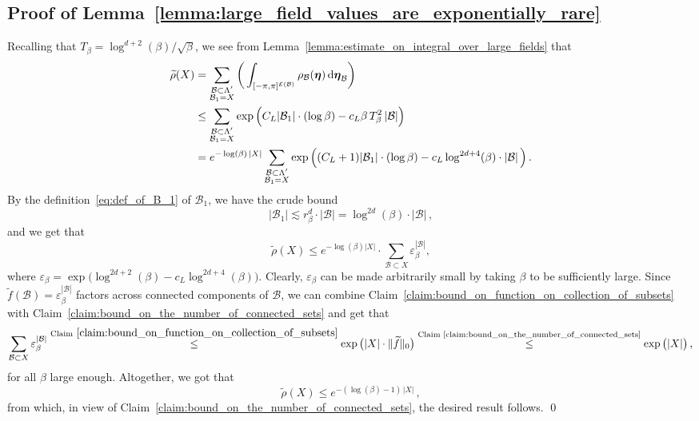 \documentclass[11pt]{article}
\theoremstyle{definition}
\theoremstyle{remark}
\numberwithin{theorem}{section}
\def\eps{{\varepsilon}}
\def\La{{\Lambda}}
\newcommand{\cE}{\mathcal{E}}
\begin{document}
    \subsection{Proof of Lemma~\ref{lemma:large_field_values_are_exponentially_rare}}
    Recalling that $T_\beta = \log^{d+2}(\beta)/\sqrt{\beta}$, we see from Lemma~\ref{lemma:estimate_on_integral_over_large_fields} that 
    \begin{align*}
        \widetilde{\rho}(X) &= \sum_{\substack{\mathcal{B} \subset \La^\prime \\ \mathcal{B}_1 = X}} \bigg(\int_{[-\pi,\pi]^{\cE(\mathcal{B})}} \rho_{\mathcal{B}}(\boldsymbol{\eta}) \, {\rm d} \boldsymbol{\eta}_{\mathcal{B}}\bigg) \\ &\le \sum_{\substack{\mathcal{B} \subset \La^\prime \\ \mathcal{B}_1 = X}} \exp\Big( C_L |\mathcal{B}_1| \cdot (\log \beta) - c_L \beta \, T_\beta^2  \, |\mathcal{B}| \Big) \\ &= e^{-\log(\beta)\, |X|} \sum_{\substack{\mathcal{B} \subset \La^\prime \\ \mathcal{B}_1 = X}} \exp\Big( (C_L +1 )|\mathcal{B}_1| \cdot (\log \beta) - c_L \log^{2d+4}(\beta)  \cdot |\mathcal{B}| \, \Big) \, .
    \end{align*}
    By the definition~\eqref{eq:def_of_B_1} of $\mathcal{B}_1$, we have the crude bound
    \[
    |\mathcal{B}_1| \lesssim r_\beta^d \cdot |\mathcal{B}| = \log^{2d}(\beta) \cdot |\mathcal{B}| \, , 
    \]
    and we get that
    \begin{equation*}
        \widetilde{\rho}(X) \le e^{-\log(\beta)|X|} \cdot  \sum_{\mathcal{B}\subset X} \eps_\beta^{|\mathcal{B}|},
    \end{equation*}
    where $\eps_\beta =  \exp\big(\log^{2d+2}( \beta ) - c_L \log^{2d+4}(\beta)  \big)$. Clearly, $\eps_\beta$ can be made arbitrarily small by taking $\beta$ to be sufficiently large. Since $\widetilde f(\mathcal{B}) = \eps_\beta^{|\mathcal{B}|}$ factors across connected components of $\mathcal{B}$, we can combine Claim~\ref{claim:bound_on_function_on_collection_of_subsets} with Claim~\ref{claim:bound_on_the_number_of_connected_sets} and get that 
    \[
    \sum_{\mathcal{B}\subset X} \eps_\beta^{|\mathcal{B}|} \stackrel{\text{Claim}~\ref{claim:bound_on_function_on_collection_of_subsets}}{\le}  \exp\big(|X| \cdot\| \widetilde{f}\|_0\big) \stackrel{\text{Claim~\ref{claim:bound_on_the_number_of_connected_sets}}}{\le}  \exp \big(|X|\big) \, ,
    \]
    for all $\beta$ large enough. Altogether, we got that
    \begin{equation*}
        \widetilde{\rho}(X) \le  e^{-(\log(\beta)-1) \, |X|} \, ,
    \end{equation*}
    from which, in view of Claim~\ref{claim:bound_on_the_number_of_connected_sets}, the desired result follows. 
    \qed 
    
\end{document}
